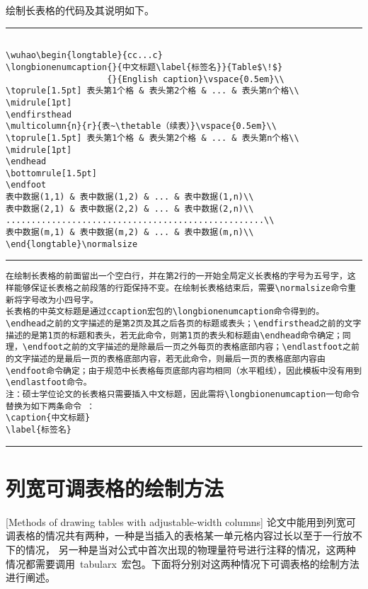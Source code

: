 绘制长表格的代码及其说明如下。
\vspace{1em}\noindent\hrule
\begin{lstlisting}

\wuhao\begin{longtable}{cc...c}
\longbionenumcaption{}{中文标题\label{标签名}}{Table$\!$}
                    {}{English caption}\vspace{0.5em}\\
\toprule[1.5pt] 表头第1个格 & 表头第2个格 & ... & 表头第n个格\\ \midrule[1pt]
\endfirsthead
\multicolumn{n}{r}{表~\thetable（续表）}\vspace{0.5em}\\
\toprule[1.5pt] 表头第1个格 & 表头第2个格 & ... & 表头第n个格\\ \midrule[1pt]
\endhead
\bottomrule[1.5pt]
\endfoot
表中数据(1,1) & 表中数据(1,2) & ... & 表中数据(1,n)\\
表中数据(2,1) & 表中数据(2,2) & ... & 表中数据(2,n)\\
...................................................\\
表中数据(m,1) & 表中数据(m,2) & ... & 表中数据(m,n)\\
\end{longtable}\normalsize
\end{lstlisting}
\noindent\hrule
\begin{lstlisting}
在绘制长表格的前面留出一个空白行，并在第2行的一开始全局定义长表格的字号为五号字，这样能够保证长表格之前段落的行距保持不变。在绘制长表格结束后，需要\normalsize命令重新将字号改为小四号字。
长表格的中英文标题是通过ccaption宏包的\longbionenumcaption命令得到的。
\endhead之前的文字描述的是第2页及其之后各页的标题或表头；\endfirsthead之前的文字描述的是第1页的标题和表头，若无此命令，则第1页的表头和标题由\endhead命令确定；同理，\endfoot之前的文字描述的是除最后一页之外每页的表格底部内容；\endlastfoot之前的文字描述的是最后一页的表格底部内容，若无此命令，则最后一页的表格底部内容由\endfoot命令确定；由于规范中长表格每页底部内容均相同（水平粗线），因此模板中没有用到\endlastfoot命令。
注：硕士学位论文的长表格只需要插入中文标题，因此需将\longbionenumcaption一句命令替换为如下两条命令 ：
\caption{中文标题}
\label{标签名}
\end{lstlisting}
\noindent\hrule

\section{列宽可调表格的绘制方法}[Methods of drawing tables with adjustable-width columns]
论文中能用到列宽可调表格的情况共有两种，一种是当插入的表格某一单元格内容过长以至于一行放不下的情况，
另一种是当对公式中首次出现的物理量符号进行注释的情况，这两种情况都需要调用~tabularx~宏包。下面将分别对这两种情况下可调表格的绘制方法进行阐述。
